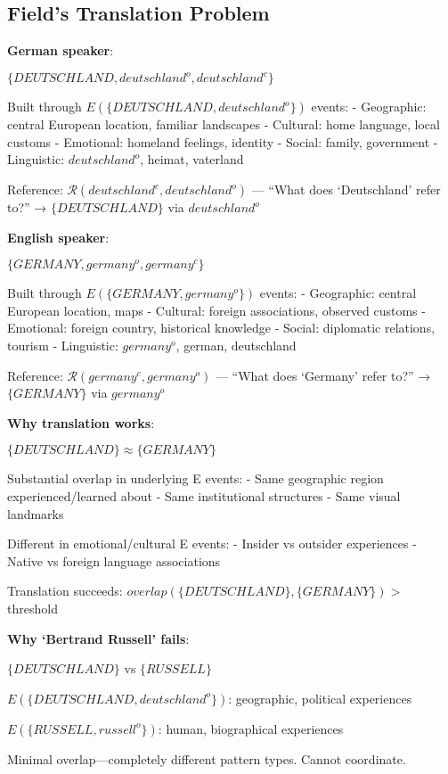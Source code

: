 \documentclass[12pt]{article}
\begin{document}
\subsection{Field's Translation Problem}\label{fields-translation-problem}

\textbf{German speaker}:

\(\{DEUTSCHLAND, deutschland^o, deutschland^c\}\)

Built through \(E(\{DEUTSCHLAND, deutschland^o\})\) events: - Geographic: central European location, familiar landscapes - Cultural: home language, local customs - Emotional: homeland feelings, identity - Social: family, government - Linguistic: \(deutschland^o\), heimat, vaterland

Reference: \(\mathcal{R}(deutschland^c, deutschland^o)\) --- ``What does `Deutschland' refer to?'' → \(\{DEUTSCHLAND\}\) via \(deutschland^o\)

\textbf{English speaker}:

\(\{GERMANY, germany^o, germany^c\}\)

Built through \(E(\{GERMANY, germany^o\})\) events: - Geographic: central European location, maps - Cultural: foreign associations, observed customs - Emotional: foreign country, historical knowledge - Social: diplomatic relations, tourism - Linguistic: \(germany^o\), german, deutschland

Reference: \(\mathcal{R}(germany^c, germany^o)\) --- ``What does `Germany' refer to?'' → \(\{GERMANY\}\) via \(germany^o\)

\textbf{Why translation works}:

\(\{DEUTSCHLAND\} \approx \{GERMANY\}\)

Substantial overlap in underlying E events: - Same geographic region experienced/learned about - Same institutional structures - Same visual landmarks

Different in emotional/cultural E events: - Insider vs outsider experiences - Native vs foreign language associations

Translation succeeds: \(overlap(\{DEUTSCHLAND\}, \{GERMANY\}) >\) threshold

\textbf{Why `Bertrand Russell' fails}:

\(\{DEUTSCHLAND\}\) vs \(\{RUSSELL\}\)

\(E(\{DEUTSCHLAND, deutschland^o\})\): geographic, political experiences

\(E(\{RUSSELL, russell^o\})\): human, biographical experiences

Minimal overlap---completely different pattern types. Cannot coordinate.
\end{document}
